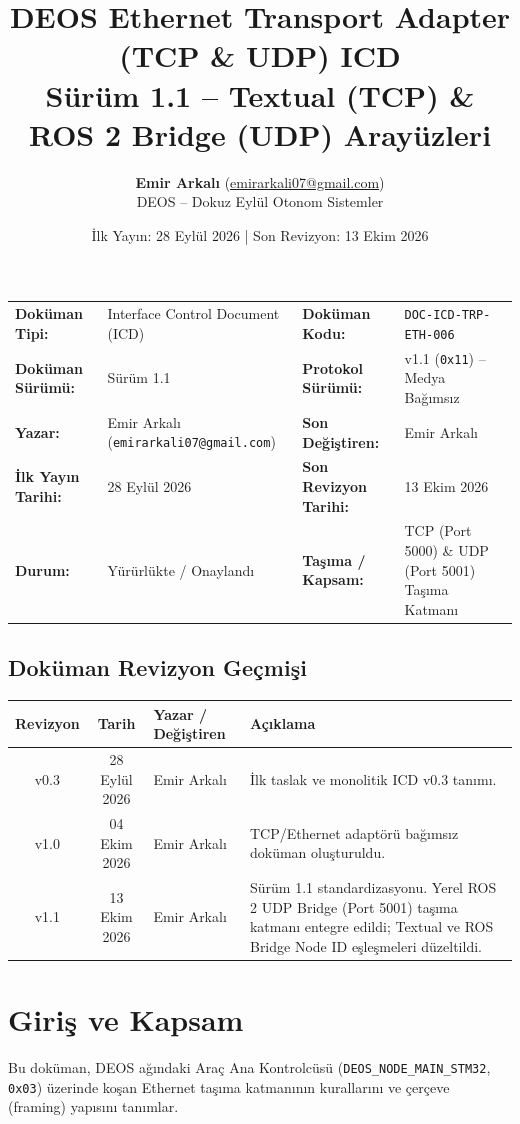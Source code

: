 \documentclass[a4paper,10pt]{article}
\title{\textbf{DEOS Ethernet Transport Adapter (TCP \& UDP) ICD}\\
\large Sürüm 1.1 -- Textual (TCP) \& ROS 2 Bridge (UDP) Arayüzleri}
\author{\textbf{Emir Arkalı} (\href{mailto:emirarkali07@gmail.com}{emirarkali07@gmail.com})\\DEOS -- Dokuz Eylül Otonom Sistemler}
\date{İlk Yayın: 28 Eylül 2026 \quad | \quad Son Revizyon: 13 Ekim 2026}
\newcommand{\hex}[1]{\texttt{0x#1}}
\newcommand{\code}[1]{\texttt{#1}}
\begin{document}
\maketitle

\begin{center}
\small
\begin{tabularx}{\textwidth}{ll lX}
\toprule
\textbf{Doküman Tipi:} & Interface Control Document (ICD) & \textbf{Doküman Kodu:} & \code{DOC-ICD-TRP-ETH-006} \\
\textbf{Doküman Sürümü:} & Sürüm 1.1 & \textbf{Protokol Sürümü:} & v1.1 (\hex{11}) -- Medya Bağımsız \\
\textbf{Yazar:} & Emir Arkalı (\texttt{emirarkali07@gmail.com}) & \textbf{Son Değiştiren:} & Emir Arkalı \\
\textbf{İlk Yayın Tarihi:} & 28 Eylül 2026 & \textbf{Son Revizyon Tarihi:} & 13 Ekim 2026 \\
\textbf{Durum:} & Yürürlükte / Onaylandı & \textbf{Taşıma / Kapsam:} & TCP (Port 5000) \& UDP (Port 5001) Taşıma Katmanı \\
\bottomrule
\end{tabularx}
\end{center}

\subsection*{Doküman Revizyon Geçmişi}
\begin{center}
\small
\begin{tabularx}{\textwidth}{c c l X}
\toprule
\textbf{Revizyon} & \textbf{Tarih} & \textbf{Yazar / Değiştiren} & \textbf{Açıklama} \\
\midrule
v0.3 & 28 Eylül 2026 & Emir Arkalı & İlk taslak ve monolitik ICD v0.3 tanımı. \\
v1.0 & 04 Ekim 2026 & Emir Arkalı & TCP/Ethernet adaptörü bağımsız doküman oluşturuldu. \\
v1.1 & 13 Ekim 2026 & Emir Arkalı & Sürüm 1.1 standardizasyonu. Yerel ROS 2 UDP Bridge (Port 5001) taşıma katmanı entegre edildi; Textual ve ROS Bridge Node ID eşleşmeleri düzeltildi. \\
\bottomrule
\end{tabularx}
\end{center}
\vspace{0.8em}

\section{Giriş ve Kapsam}
Bu doküman, DEOS ağındaki Araç Ana Kontrolcüsü (\code{DEOS\_NODE\_MAIN\_STM32}, \hex{03}) üzerinde koşan Ethernet taşıma katmanının kurallarını ve çerçeve (framing) yapısını tanımlar. 
\end{document}
